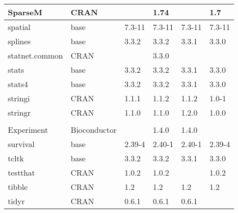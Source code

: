 \begin{longtable}{|llllll|}
SparseM                       & CRAN                      &             & 1.74        &                & 1.7               \\ \hline \rowcolor{gray!25}
spatial                       & base                      & 7.3-11      & 7.3-11      & 7.3-11         & 7.3-11           \\ \hline
splines                       & base                      & 3.3.2       & 3.3.2       & 3.3.1          & 3.3.0             \\ \hline \rowcolor{gray!25}
statnet.common                & CRAN                      &             & 3.3.0       &                &                  \\ \hline
stats                         & base                      & 3.3.2       & 3.3.2       & 3.3.1          & 3.3.0             \\ \hline \rowcolor{gray!25}
stats4                        & base                      & 3.3.2       & 3.3.2       & 3.3.1          & 3.3.0            \\ \hline
stringi                       & CRAN                      & 1.1.1       & 1.1.2       & 1.1.2          & 1.0-1             \\ \hline \rowcolor{gray!25}
stringr                       & CRAN                      & 1.1.0       & 1.1.0       & 1.2.0          & 1.0.0            \\ \hline
\begin{tabular}[c]{@{}l@{}}Summarized\\Experiment \end{tabular}          & Bioconductor              &             & 1.4.0       & 1.4.0          &                   \\ \hline \rowcolor{gray!25}
survival                      & base                      & 2.39-4      & 2.40-1      & 2.40-1         & 2.39-4           \\ \hline
tcltk                         & base                      & 3.3.2       & 3.3.2       & 3.3.1          & 3.3.0             \\ \hline \rowcolor{gray!25}
testthat                      & CRAN                      & 1.0.2       & 1.0.2       &                & 1.0.2            \\ \hline
tibble                        & CRAN                      & 1.2         & 1.2         & 1.2            & 1.2               \\ \hline \rowcolor{gray!25}
tidyr                         & CRAN                      & 0.6.1       & 0.6.1       & 0.6.1          &                  \\ \hline

\end{longtable}
